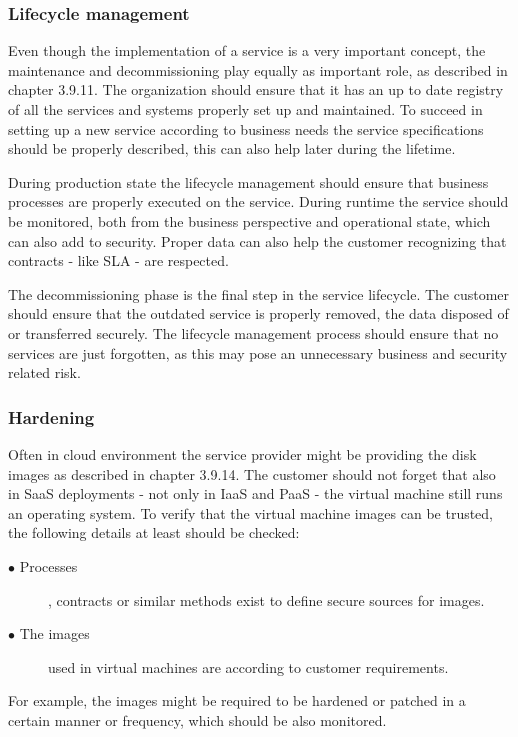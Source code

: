 \documentclass{article}
\begin{document}
\subsubsection{Lifecycle management}
Even though the implementation of a service is a very important concept, the maintenance and decommissioning play equally as important role, as described in chapter 3.9.11. The organization should ensure that it has an up to date registry of all the services and systems properly set up and maintained. To succeed in setting up a new service according to business needs the service specifications should be properly described, this can also help later during the lifetime.
\par
During production state the lifecycle management should ensure that business processes are properly executed on the service. During runtime the service should be monitored, both from the business perspective and operational state, which can also add to security. Proper data can also help the customer recognizing that contracts - like SLA - are respected.
\par
The decommissioning phase is the final step in the service lifecycle. The customer should ensure that the outdated service is properly removed, the data disposed of or transferred securely. The lifecycle management process should ensure that no services are just forgotten, as this may pose an unnecessary business and security related risk.

\subsubsection{Hardening}
Often in cloud environment the service provider might be providing the disk images as described in chapter 3.9.14. The customer should not forget that also in SaaS deployments - not only in IaaS and PaaS - the virtual machine still runs an operating system. To verify that the virtual machine images can be trusted, the following details at least should be checked:
\begin{description}
	\item[$\bullet$ Processes], contracts or similar methods exist to define secure sources for images.
	\item[$\bullet$ The images] used in virtual machines are according to customer requirements.
\end{description}
For example, the images might be required to be hardened or patched in a certain manner or frequency, which should be also monitored.
\end{document}
